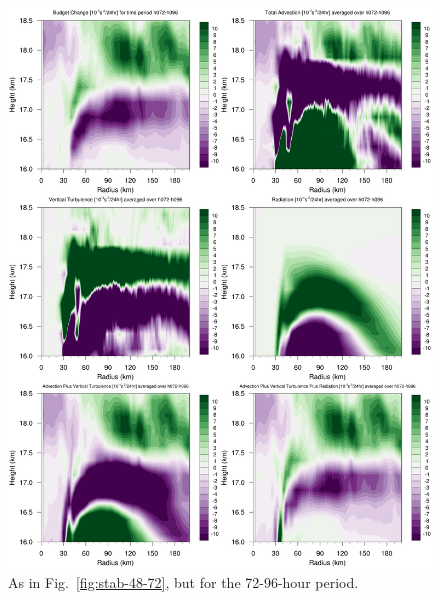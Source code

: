 \documentclass{ametsoc}
\begin{document}
\begin{figure}[ht]
\centerline{\includegraphics[width=33pc]{figures/fig08_h072-h096-budgetterms.png}}
\caption{As in Fig.~\ref{fig:stab-48-72}, but for the 72-96-hour period.}
\label{fig:stab-72-96}
\end{figure}

\end{document}
